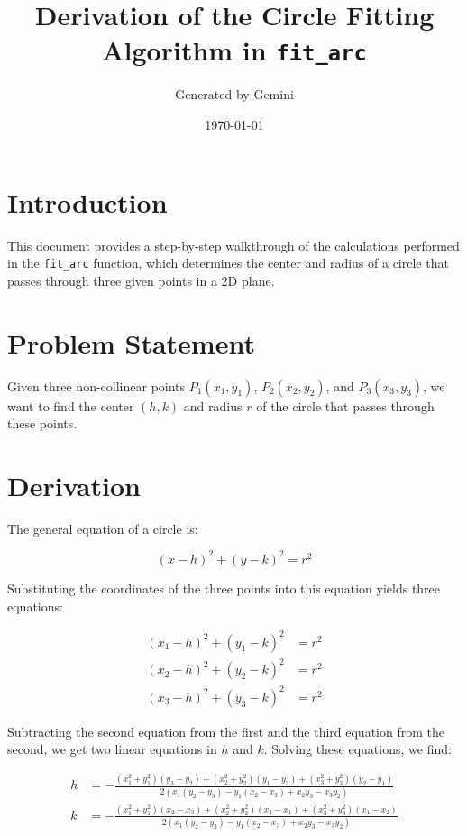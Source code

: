 \documentclass{article}
\title{Derivation of the Circle Fitting Algorithm in \texttt{fit\_arc}}
\author{Generated by Gemini}
\date{\today}
\begin{document}
\maketitle

\section{Introduction}

This document provides a step-by-step walkthrough of the calculations performed in the \texttt{fit\_arc} function, which determines the center and radius of a circle that passes through three given points in a 2D plane.

\section{Problem Statement}

Given three non-collinear points $P_1(x_1, y_1)$, $P_2(x_2, y_2)$, and $P_3(x_3, y_3)$, we want to find the center $(h, k)$ and radius $r$ of the circle that passes through these points.

\section{Derivation}

The general equation of a circle is:

$$(x - h)^2 + (y - k)^2 = r^2$$

Substituting the coordinates of the three points into this equation yields three equations:

\begin{align*}
(x_1 - h)^2 + (y_1 - k)^2 &= r^2 \\
(x_2 - h)^2 + (y_2 - k)^2 &= r^2 \\
(x_3 - h)^2 + (y_3 - k)^2 &= r^2
\end{align*}

Subtracting the second equation from the first and the third equation from the second, we get two linear equations in $h$ and $k$. Solving these equations, we find:

\begin{align*}
h &= -\frac{(x_1^2 + y_1^2)(y_3 - y_2) + (x_2^2 + y_2^2)(y_1 - y_3) + (x_3^2 + y_3^2)(y_2 - y_1)}{2(x_1(y_2 - y_3) - y_1(x_2 - x_3) + x_2y_3 - x_3y_2)} \\
k &= -\frac{(x_1^2 + y_1^2)(x_2 - x_3) + (x_2^2 + y_2^2)(x_3 - x_1) + (x_3^2 + y_3^2)(x_1 - x_2)}{2(x_1(y_2 - y_3) - y_1(x_2 - x_3) + x_2y_3 - x_3y_2)}
\end{align*}
\end{document}
